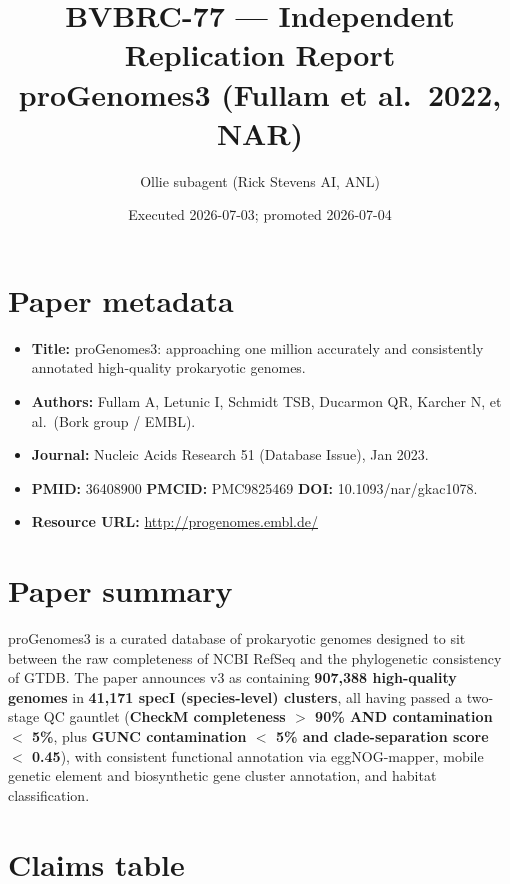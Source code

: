 \documentclass[11pt]{article}
\title{BVBRC-77 --- Independent Replication Report\\
\large proGenomes3 (Fullam et al.\ 2022, NAR)}
\author{Ollie subagent (Rick Stevens AI, ANL)}
\date{Executed 2026-07-03; promoted 2026-07-04}
\begin{document}
\maketitle

\begin{center}
\end{center}

\section{Paper metadata}

\begin{itemize}[leftmargin=1.5em]
  \item \textbf{Title:} proGenomes3: approaching one million accurately and consistently annotated high-quality prokaryotic genomes.
  \item \textbf{Authors:} Fullam A, Letunic I, Schmidt TSB, Ducarmon QR, Karcher N, et al.\ (Bork group / EMBL).
  \item \textbf{Journal:} Nucleic Acids Research 51 (Database Issue), Jan 2023.
  \item \textbf{PMID:} 36408900 \quad \textbf{PMCID:} PMC9825469 \quad \textbf{DOI:} 10.1093/nar/gkac1078.
  \item \textbf{Resource URL:} \url{http://progenomes.embl.de/}
\end{itemize}

\section{Paper summary}

proGenomes3 is a curated database of prokaryotic genomes designed to sit between
the raw completeness of NCBI RefSeq and the phylogenetic consistency of GTDB.
The paper announces v3 as containing \textbf{907{,}388 high-quality genomes} in
\textbf{41{,}171 specI (species-level) clusters}, all having passed a two-stage QC
gauntlet (\textbf{CheckM completeness $>$ 90\% AND contamination $<$ 5\%}, plus
\textbf{GUNC contamination $<$ 5\% and clade-separation score $<$ 0.45}), with consistent
functional annotation via eggNOG-mapper, mobile genetic element and biosynthetic
gene cluster annotation, and habitat classification.

\section{Claims table}
\end{document}
